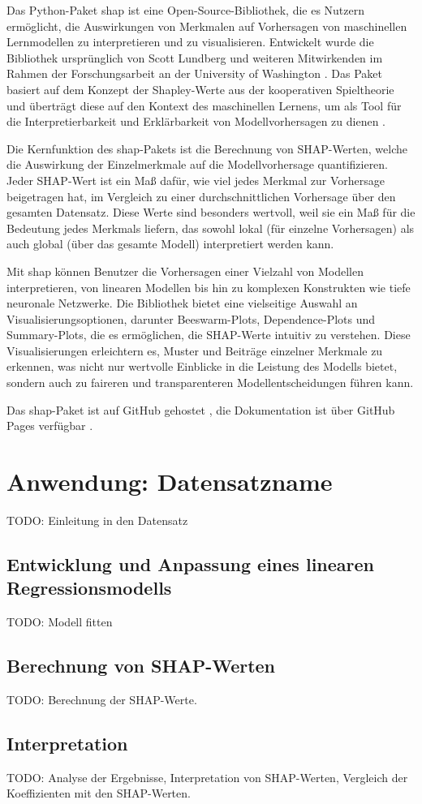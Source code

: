 Das Python-Paket \textsf{shap} ist eine Open-Source-Bibliothek, die es Nutzern ermöglicht, 
die Auswirkungen von Merkmalen auf Vorhersagen von maschinellen Lernmodellen zu interpretieren und zu visualisieren. 
Entwickelt wurde die Bibliothek ursprünglich von Scott Lundberg und weiteren Mitwirkenden im Rahmen der Forschungsarbeit 
an der University of Washington \cite{NIPS2017_8a20a862}. Das Paket basiert auf dem Konzept der Shapley-Werte aus der kooperativen Spieltheorie 
und überträgt diese auf den Kontext des maschinellen Lernens, um als Tool für die Interpretierbarkeit und Erklärbarkeit 
von Modellvorhersagen zu dienen \cite{shap_docs}.

Die Kernfunktion des \textsf{shap}-Pakets ist die Berechnung von \acs{SHAP}-Werten, welche die Auswirkung der 
Einzelmerkmale auf die Modellvorhersage quantifizieren. Jeder \acs{SHAP}-Wert ist ein Maß dafür, wie viel jedes Merkmal 
zur Vorhersage beigetragen hat, im Vergleich zu einer durchschnittlichen Vorhersage über den gesamten Datensatz. 
Diese Werte sind besonders wertvoll, weil sie ein Maß für die Bedeutung jedes Merkmals liefern, 
das sowohl lokal (für einzelne Vorhersagen) als auch global (über das gesamte Modell) interpretiert werden kann.

Mit \textsf{shap} können Benutzer die Vorhersagen einer Vielzahl von Modellen interpretieren, 
von linearen Modellen bis hin zu komplexen Konstrukten wie tiefe neuronale Netzwerke. 
Die Bibliothek bietet eine vielseitige Auswahl an Visualisierungsoptionen, darunter Beeswarm-Plots, Dependence-Plots und 
Summary-Plots, die es ermöglichen, die \acs{SHAP}-Werte intuitiv zu verstehen.
Diese Visualisierungen erleichtern es, Muster und Beiträge einzelner Merkmale zu erkennen, 
was nicht nur wertvolle Einblicke in die Leistung des Modells bietet, sondern auch zu faireren und transparenteren 
Modellentscheidungen führen kann. 

Das \textsf{shap}-Paket ist auf GitHub gehostet \cite{github_shap}, die Dokumentation ist über GitHub Pages verfügbar \cite{shap_docs}.

\section{Anwendung: Datensatzname}

TODO: Einleitung in den Datensatz

\subsection{Entwicklung und Anpassung eines linearen Regressionsmodells}

TODO: Modell fitten

\subsection{Berechnung von \acs{SHAP}-Werten}

TODO: Berechnung der \acs{SHAP}-Werte.

\subsection{Interpretation}

TODO: Analyse der Ergebnisse, Interpretation von \acs{SHAP}-Werten, Vergleich der Koeffizienten mit den \acs{SHAP-Werten}.